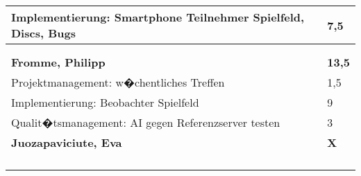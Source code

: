 \documentclass[a4paper,11pt]{scrartcl}
\begin{document}
\begin{longtable}{| p{13.8cm} | C{2.4cm} |}
  Implementierung: Smartphone Teilnehmer Spielfeld, Discs, Bugs
	&
  7,5
	\\
	\hline


	&

	\\
	\hline


	&

	\\
	\hline
	\hline


	\textbf{Fromme, Philipp} & \textbf{13,5}\\ %
	\hline

	Projektmanagement: w�chentliches Treffen
	&
	1,5
	\\
	\hline

	Implementierung: Beobachter Spielfeld
	&
	9
	\\
	\hline

  Qualit�tsmanagement: AI gegen Referenzserver testen
	&
  3
	\\
	\hline
	\hline


	\textbf{Juozapaviciute, Eva} & \textbf{X}\\ %
	\hline


	&

	\\
	\hline


	&

	\\
	\hline


	&

	\\
	\hline


	&

	\\
	\hline
	\hline



\end{longtable}
\end{document}
